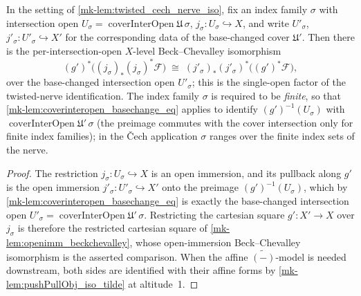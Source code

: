 \begin{lemma}\label{mk-lem:twisted_cech_nerve_per_sigma}
  \leanok

  In the setting of \ref{mk-lem:twisted_cech_nerve_iso}, fix an index family \(\sigma\) with
  intersection open \(U_\sigma = \operatorname{coverInterOpen}\mathfrak{U}\,\sigma\),
  \(j_\sigma : U_\sigma \hookrightarrow X\), and write \(U'_\sigma\),
  \(j'_\sigma : U'_\sigma \hookrightarrow X'\) for the corresponding data of the base-changed
  cover \(\mathfrak{U}'\). Then there is the per-intersection-open \(X\)-level Beck--Chevalley
  isomorphism
  \[
    (g')^*\bigl((j_\sigma)_* (j_\sigma)^*\mathcal{F}\bigr)
      \;\cong\;
    (j'_\sigma)_* (j'_\sigma)^*\bigl((g')^*\mathcal{F}\bigr),
  \]
  over the base-changed intersection open \(U'_\sigma\); this is the single-open factor of the
  twisted-nerve identification. The index family \(\sigma\) is required to be \emph{finite}, so
  that \ref{mk-lem:coverinteropen_basechange_eq} applies to identify
  \((g')^{-1}(U_\sigma)\) with \(\operatorname{coverInterOpen}\mathfrak{U}'\,\sigma\) (the
  preimage commutes with the cover intersection only for finite index families); in the
  {\v C}ech application \(\sigma\) ranges over the finite index sets of the nerve.
\end{lemma}
\begin{proof}
  \leanok{}
  The restriction \(j_\sigma : U_\sigma \hookrightarrow X\) is an open immersion, and its
  pullback along \(g'\) is the open immersion \(j'_\sigma : U'_\sigma \hookrightarrow X'\) onto
  the preimage \((g')^{-1}(U_\sigma)\), which by \ref{mk-lem:coverinteropen_basechange_eq} is
  exactly the base-changed intersection open
  \(U'_\sigma = \operatorname{coverInterOpen}\mathfrak{U}'\,\sigma\). Restricting the cartesian
  square \(g' : X' \to X\) over \(j_\sigma\) is therefore the restricted cartesian square of
  \ref{mk-lem:openimm_beckchevalley}, whose open-immersion Beck--Chevalley isomorphism is the
  asserted comparison. When the affine \(\widetilde{(-)}\)-model is needed downstream, both
  sides are identified with their affine forms by \ref{mk-lem:pushPullObj_iso_tilde} at
  altitude~1.
\end{proof}

